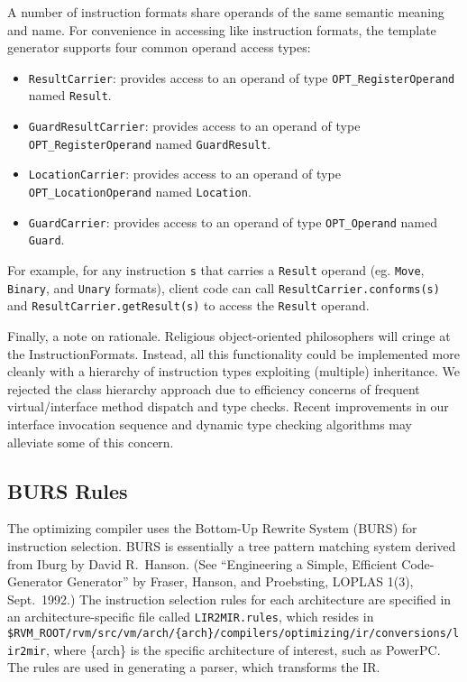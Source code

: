 A number of instruction formats share operands of 
the same semantic meaning and name.  For convenience in accessing
like instruction formats, the template generator supports four
common operand access types:
\begin{itemize}
\item {\tt ResultCarrier}: provides access to an operand of type {\tt OPT\_RegisterOperand} named {\tt Result}.
\item {\tt GuardResultCarrier}: provides access to an operand of type {\tt OPT\_RegisterOperand} named {\tt GuardResult}.
\item {\tt LocationCarrier}: provides access to an operand of type {\tt OPT\_LocationOperand} named {\tt Location}.
\item {\tt GuardCarrier}: provides access to an operand of type {\tt OPT\_Operand} named {\tt Guard}.
\end{itemize}

For example, for any instruction {\tt s} that carries a {\tt Result} operand
(eg. {\tt Move}, {\tt Binary}, and {\tt Unary} formats), client code can call
{\tt ResultCarrier.conforms(s)} and {\tt ResultCarrier.getResult(s)} to access
the {\tt Result} operand.

Finally, a note on rationale.  Religious object-oriented philosophers
will cringe at the InstructionFormats.  Instead, all this
functionality could be implemented more cleanly with a hierarchy of
instruction types exploiting (multiple) inheritance.  We rejected the
class hierarchy approach due to efficiency concerns of frequent
virtual/interface method dispatch and type checks.  Recent
improvements in our interface invocation sequence and dynamic type
checking algorithms may alleviate some of this concern.

\subsection{BURS Rules}\label{burs}

The optimizing compiler uses the Bottom-Up Rewrite System (BURS) for
instruction selection.  BURS is essentially a tree pattern matching
system derived from Iburg by David R.\ Hanson.   (See ``Engineering a
Simple, Efficient Code-Generator Generator'' by Fraser, Hanson, and
Proebsting, LOPLAS 1(3), Sept.\ 1992.)
The instruction selection rules for each architecture are specified in an
architecture-specific file called {\tt LIR2MIR.rules}, which resides in
{\tt \$RVM\_ROOT/rvm/src/vm/arch/\{arch\}/compilers/optimizing/ir/conversions/lir2mir}, where \{arch\} is the
specific architecture of interest, such as PowerPC\PowerPCTMFootnote.
The rules are 
used in generating a parser, which transforms the IR.

